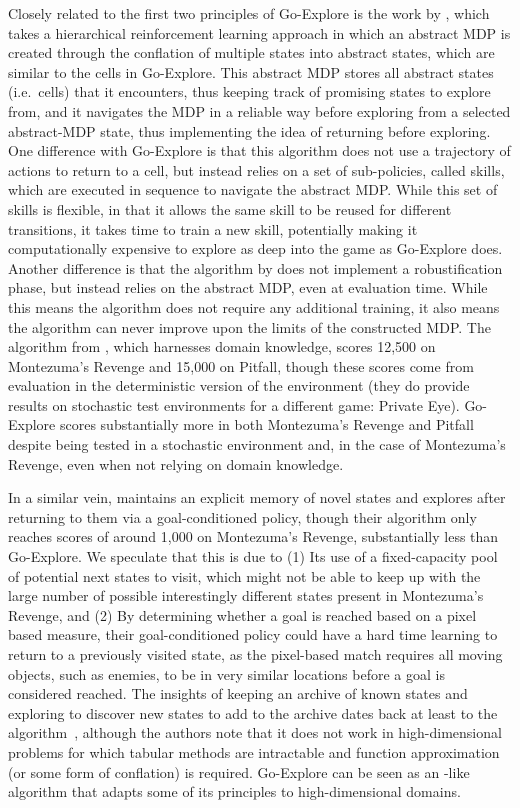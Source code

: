 \documentclass{article}
\begin{document}
Closely related to the first two principles of Go-Explore is the work by \citet{liu2019learning}, which takes a hierarchical reinforcement learning approach in which an abstract MDP is created through the conflation of multiple states into abstract states, which are similar to the cells in Go-Explore.
This abstract MDP stores all abstract states (i.e.~cells) that it encounters, thus keeping track of promising states to explore from, and it navigates the MDP in a reliable way before exploring from a selected abstract-MDP state, thus implementing the idea of returning before exploring. One difference with Go-Explore is that this algorithm does not use a trajectory of actions to return to a cell, but instead relies on a set of sub-policies, called skills, which are executed in sequence to navigate the abstract MDP. While this set of skills is flexible, in that it allows the same skill to be reused for different transitions, it takes time to train a new skill, potentially making it computationally expensive to explore as deep into the game as Go-Explore does. Another difference is that the algorithm by \citet{liu2019learning} does not implement a robustification phase, but instead relies on the abstract MDP, even at evaluation time. While this means the algorithm does not require any additional training, it also means the algorithm can never improve upon the limits of the constructed MDP.
The algorithm from \citet{liu2019learning}, which harnesses domain knowledge, scores 12,500 on Montezuma's Revenge and 15,000 on Pitfall, though these scores come from evaluation in the deterministic version of the environment (they do provide results on stochastic test environments for a different game: Private Eye).
Go-Explore scores substantially more in both Montezuma's Revenge and Pitfall despite being tested in a stochastic environment and, in the case of Montezuma's Revenge, even when not relying on domain knowledge. 

In a similar vein, \citet{dong2019explicit} maintains an explicit memory of novel states and explores after returning to them via a goal-conditioned policy, though their algorithm only reaches scores of around 1,000 on Montezuma's Revenge, substantially less than Go-Explore. We speculate that this is due to (1) Its use of a fixed-capacity pool of potential next states to visit, which might not be able to keep up with the large number of possible interestingly different states present in Montezuma's Revenge, and (2) By determining whether a goal is reached based on a pixel based measure, their goal-conditioned policy could have a hard time learning to return to a previously visited state, as the pixel-based match requires all moving objects, such as enemies, to be in very similar locations before a goal is considered reached.
The insights of keeping an archive of known states and exploring to discover new states to add to the archive dates back at least to the  algorithm~\cite{kearns2002near}, although the  authors note that it does not work in high-dimensional problems for which tabular methods are intractable and function approximation (or some form of conflation) is required. Go-Explore can be seen as an -like algorithm that adapts some of its principles to high-dimensional domains.
\end{document}
